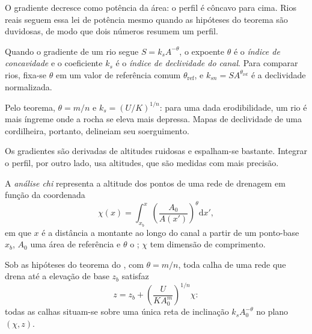 O gradiente decresce como potência da área: o perfil é côncavo para cima. Rios reais
seguem essa lei de potência mesmo quando as hipóteses do teorema são
duvidosas, de modo que dois números resumem um perfil.

\begin{definition}\label{def:b3:quantitative-geomorphology:indices}
Quando o gradiente de um rio segue $S = k_s A^{-\theta}$, o expoente
$\theta$ é o \emph{índice de concavidade} e o
coeficiente $k_s$ é o \emph{índice de declividade do canal}.
Para comparar rios, fixa-se $\theta$ em um valor de referência comum
$\theta_{\mathrm{ref}}$, e $k_{sn} = S A^{\theta_{\mathrm{ref}}}$ é a
declividade normalizada.
\end{definition}

Pelo teorema, $\theta = m/n$ e $k_s = (U/K)^{1/n}$: para uma dada erodibilidade,
um rio é mais íngreme onde a rocha se eleva mais depressa. Mapas de declividade
de uma cordilheira, portanto, delineiam seu soerguimento.


Os gradientes são derivadas de altitudes ruidosas e espalham-se bastante. Integrar
o perfil, por outro lado, usa altitudes, que são medidas com mais precisão.

\begin{definition}\label{def:b3:quantitative-geomorphology:chi}
A \emph{análise chi} representa a altitude dos pontos
de uma rede de drenagem em função da coordenada
\[
\chi(x) = \int_{x_b}^{x} \left(\frac{A_0}{A(x')}\right)^{\theta}
\mathrm{d}x' ,
\]
em que $x$ é a distância a montante ao longo do canal a partir de um ponto-base
$x_b$, $A_0$ uma área de referência e $\theta$ o ; $\chi$ tem
dimensão de comprimento.
\end{definition}

\begin{proposition}\label{prop:b3:quantitative-geomorphology:chi}
Sob as hipóteses do teorema do , com $\theta = m/n$,
toda calha de uma rede que drena até a elevação de base $z_b$ satisfaz
\[
z = z_b + \left(\frac{U}{K A_0^{m}}\right)^{1/n} \chi :
\]
todas as calhas situam-se sobre uma única reta de inclinação $k_s A_0^{-\theta}$ no
plano $(\chi, z)$.
\end{proposition}

